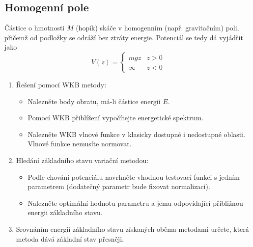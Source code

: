 \subsection{Homogenní pole}
Částice o hmotnosti $M$ (hopík) skáče v homogenním (např. gravitačním) poli,
přičemž od podložky se odráží bez ztráty energie.
Potenciál se tedy dá vyjádřit jako
\begin{equation}
    V(z)=
    \begin{cases}
    mgz & z > 0 \\
    \infty & z < 0
    \end{cases}
\end{equation}

\begin{enumerate}
\item 
        Řešení pomocí WKB metody:
        \begin{itemize}
        \item 
            Nalezněte body obratu, má-li částice energii $E$.

        \item 
            Pomocí WKB přiblížení vypočítejte energetické spektrum.

        \item
            Nalezněte WKB vlnové funkce v klasicky dostupné i nedostupné oblasti.
            Vlnové funkce nemusíte normovat.
        \end{itemize}

    \item 
        Hledání základního stavu variační metodou:
        \begin{itemize}
        \item 
            Podle chování potenciálu navrhněte vhodnou testovací funkci s jedním parametrem (dodatečný parametr bude fixovat normalizaci).

        \item 
            Nalezněte optimální hodnotu parametru a jemu odpovídající přibližnou energii základního stavu.
        \end{itemize}

    \item 
        Srovnáním energií základního stavu získaných oběma metodami určete, která metoda dává základní stav přesněji.
\end{enumerate}	
